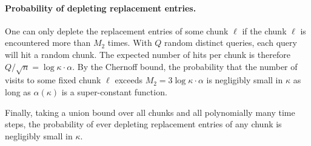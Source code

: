 \paragraph{Probability of depleting replacement entries.} 
One can only deplete the replacement 
entries of some chunk $\ell$ if the chunk $\ell$
is encountered more than $M_2$ times.
With $Q$ random distinct queries, 
each query will hit a random chunk.
The expected number of hits per chunk
is therefore $Q/\sqrt{n} = \log \kappa \cdot \alpha$.
By the Chernoff bound, 
the probability that the number of visits to some fixed chunk $\ell$
exceeds $M_2 = 3 \log \kappa \cdot \alpha$ is negligibly small
in $\kappa$ as long as $\alpha(\kappa)$ is a super-constant function.

Finally, taking a union bound over 
all chunks and 
all polynomially many time steps,
the probability of ever 
depleting replacement entries of any chunk
is negligibly small in $\kappa$. 



